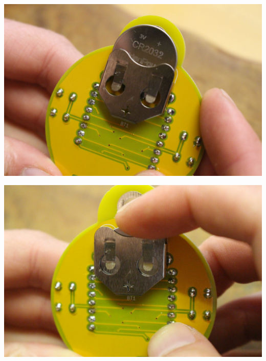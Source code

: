 \documentclass{article}
\begin{document}
\vspace{0.5cm}

\begin{minipage}[b]{0.5\textwidth}
	\includegraphics[width=\textwidth]{Bilder/IMG_5627.JPG}
\end{minipage}
\begin{minipage}[b]{0.5\textwidth}
	\includegraphics[width=\textwidth]{Bilder/IMG_5628.JPG}
\end{minipage}

\vspace{0.5cm}
\end{document}
